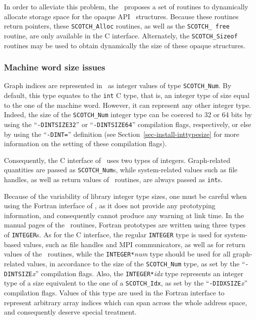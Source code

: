 In order to alleviate this problem, the \libscotch\ proposes a set of
routines to dynamically allocate storage space for the opaque API
\scotch\ structures. Because these routines return pointers, these
{\tt SCOTCH\_\lbt *Alloc} routines, as well as the {\tt SCOTCH\_\lbt
free} routine, are only available in the C interface. Alternately, the
{\tt SCOTCH\_\lbt *Sizeof} routines may be used to obtain dynamically
the size of these opaque structures.

\subsubsection{Machine word size issues}
\label{sec-lib-inttypesize}

Graph indices are represented in \scotch\ as integer values of type
{\tt SCOTCH\_\lbt Num}. By default, this type equates to the {\tt int}
C type, that is, an integer type of size equal to the one of
the machine word. However, it can represent any other integer
type. Indeed, the size of the {\tt SCOTCH\_\lbt Num} integer type can
be coerced to 32 or 64 bits by using the ``{\tt -DINTSIZE32}'' or
``{\tt -DINTSIZE64}'' compilation flags, respectively, or else by
using the ``{\tt -DINT=}'' definition (see
Section~\ref{sec-install-inttypesize} for more information on the
setting of these compilation flags).

Consequently, the C interface of \scotch\ uses two types of integers.
Graph-related quantities are passed as {\tt SCOTCH\_\lbt Num}s,
while system-related values such as file handles, as well as
return values of \libscotch\ routines, are always passed as
{\tt int}s.

Because of the variability of library integer type sizes, one must be
careful when using the Fortran interface of \scotch, as it does not
provide any prototyping information, and consequently cannot produce
any warning at link time. In the manual pages of the
\libscotch\ routines, Fortran prototypes are written using three types
of {\tt INTEGER}s. As for the C interface, the regular {\tt INTEGER}
type is used for system-based values, such as file handles and MPI
communicators, as well as for return values of the
\libscotch\ routines, while the {\tt INTEGER*}{\it num} type
should be used for all graph-related values, in accordance to the size
of the {\tt SCOTCH\_\lbt Num} type, as set by the
``{\tt -DINTSIZE}{\it x\/}'' compilation flags. Also, the
{\tt INTEGER*}{\it idx} type represents an integer type of a size
equivalent to the one of a {\tt SCOTCH\_\lbt Idx}, as set by the
``{\tt -DIDXSIZE}{\it x\/}'' compilation flags. Values of this type
are used in the Fortran interface to represent arbitrary array indices
which can span across the whole address space, and consequently
deserve special treatment.

